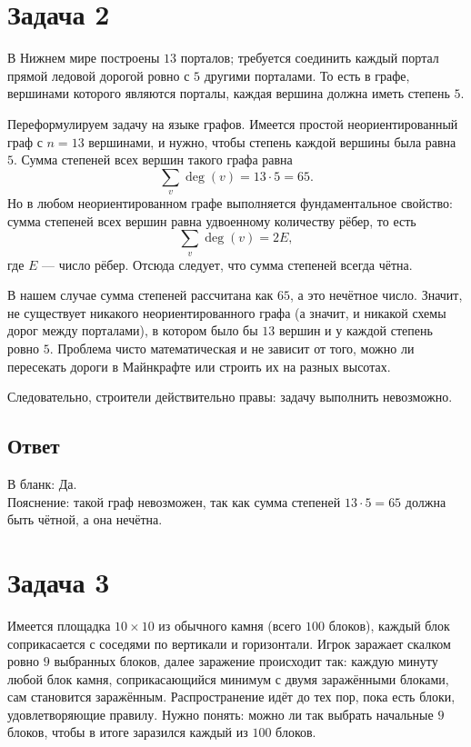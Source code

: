 \documentclass[12pt,a4paper]{article}
\begin{document}
\section*{Задача 2}

В Нижнем мире построены $13$ порталов; требуется соединить каждый портал прямой ледовой дорогой ровно с $5$ другими порталами. То есть в графе, вершинами которого являются порталы, каждая вершина должна иметь степень $5$.

Переформулируем задачу на языке графов. Имеется простой неориентированный граф с $n = 13$ вершинами, и нужно, чтобы степень каждой вершины была равна $5$. Сумма степеней всех вершин такого графа равна
\[
\sum_{v} \deg(v) = 13 \cdot 5 = 65.
\]
Но в любом неориентированном графе выполняется фундаментальное свойство: сумма степеней всех вершин равна удвоенному количеству рёбер, то есть
\[
\sum_{v} \deg(v) = 2E,
\]
где $E$ --- число рёбер. Отсюда следует, что сумма степеней всегда чётна.

В нашем случае сумма степеней рассчитана как $65$, а это нечётное число. Значит, не существует никакого неориентированного графа (а значит, и никакой схемы дорог между порталами), в котором было бы $13$ вершин и у каждой степень ровно $5$. Проблема чисто математическая и не зависит от того, можно ли пересекать дороги в Майнкрафте или строить их на разных высотах.

Следовательно, строители действительно правы: задачу выполнить невозможно.

\subsection*{Ответ}
В бланк: Да.\\
Пояснение: такой граф невозможен, так как сумма степеней $13 \cdot 5 = 65$ должна быть чётной, а она нечётна.

\newpage

\section*{Задача 3}

Имеется площадка $10 \times 10$ из обычного камня (всего $100$ блоков), каждый блок соприкасается с соседями по вертикали и горизонтали. Игрок заражает скалком ровно $9$ выбранных блоков, далее заражение происходит так: каждую минуту любой блок камня, соприкасающийся минимум с двумя заражёнными блоками, сам становится заражённым. Распространение идёт до тех пор, пока есть блоки, удовлетворяющие правилу. Нужно понять: можно ли так выбрать начальные $9$ блоков, чтобы в итоге заразился каждый из $100$ блоков.
\end{document}
